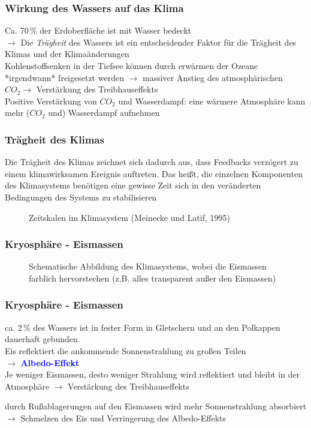 \begin{frame}
	\frametitle{Wirkung des Wassers auf das Klima}
	Ca. 70\,\% der Erdoberfläche ist mit Wasser bedeckt\\
	$\rightarrow$ Die \textit{Trägheit} des Wassers ist ein entscheidender Faktor für die Trägheit des Klimas und der Klimaänderungen \\%
	Kohlenstoffsenken in der Tiefsee können durch erwärmen der Ozeane *irgendwann* freigesetzt werden $\rightarrow$ massiver Anstieg des atmosphärischen $CO_2 \rightarrow$ Verstärkung des Treibhauseffekts\\
	Positive Verstärkung von $CO_2$ und Wasserdampf: eine wärmere Atmosphäre kann mehr ($CO_2$ und) Wasserdampf aufnehmen
\end{frame}

\begin{frame}
	\frametitle{Trägheit des Klimas}
	Die Trägheit des Klimas zeichnet sich dadurch aus, dass Feedbacks verzögert zu einem klimawirksamen Ereignis auftreten. Das heißt, die einzelnen Komponenten des Klimasystems benötigen eine gewisse Zeit sich in den veränderten Bedingungen des Systems zu stabilisieren
	
	
	\begin{figure}
		\caption{Zeitskalen im Klimasystem (Meinecke und Latif, 1995)}
	\end{figure}
\end{frame}

\begin{frame}
	\frametitle{Kryosphäre - Eismassen}
	
	\begin{figure}
		\caption{Schematische Abbildung des Klimasystems, wobei die Eismassen farblich hervorstechen (z.B. alles transparent außer den Eismassen)}
	\end{figure}
\end{frame}

\begin{frame}
	\frametitle{Kryosphäre - Eismassen} %
	ca. 2\,\% des Wassers ist in fester Form in Gletschern und an den Polkappen dauerhaft gebunden. \\
	Eis reflektiert die ankommende Sonnenstrahlung zu großen Teilen\\
	$\rightarrow$ \textbf{\textcolor{blue}{Albedo-Effekt}}\\
	
	Je weniger Eismassen, desto weniger Strahlung wird reflektiert und bleibt in der Atmosphäre $\rightarrow$ Verstärkung des Treibhauseffekts
	
	durch Rußablagerungen auf den Eismassen wird mehr Sonnenstrahlung absorbiert $\rightarrow$ Schmelzen des Eis und Verringerung des Albedo-Effekts %
	
\end{frame}

